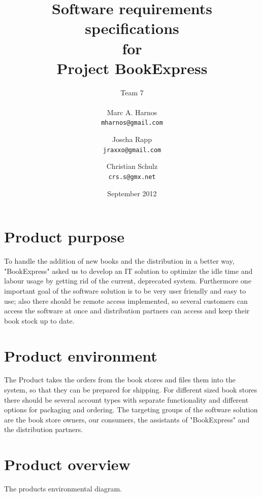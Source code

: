 \documentclass[11pt,a4paper,oneside,svgnames]{report}
\begin{document}
\title{Software requirements specifications\\ for\\ Project BookExpress}
\author{Team 7\\ \\ Marc A. Harnos\\ \texttt{mharnos@gmail.com} \and Joscha Rapp\\ \texttt{jraxxo@gmail.com} \and Christian Schulz\\ \texttt{crs.s@gmx.net}}
\date{September 2012}
\maketitle
\tableofcontents

\chapter{Product purpose}
To handle the addition of new books and the distribution in a better way, "BookExpress" asked us to develop an IT solution to optimize the idle time and labour usage by getting rid of the current, deprecated system. Furthermore one important goal of the software solution is to be very user friendly and easy to use; also there should be remote access implemented, so several customers can access the software at once and distribution partners can access and keep their book stock up to date.

\chapter{Product environment}
The Product takes the orders from the book stores and files them into the system, so that they can be prepared for shipping. For different sized book stores there should be several account types with separate functionality and different options for packaging and ordering. The targeting groups of the software solution are the book store owners, our consumers, the assistants of "BookExpress" and the distribution partners.

\chapter{Product overview}
The products environmental diagram.
\end{document}
